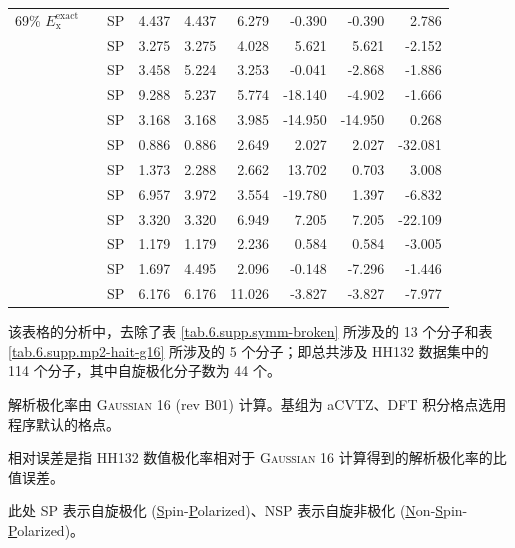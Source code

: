 \begin{table}[ht]
\begin{tabular}{lll:d{2.3}d{2.3}d{2.3}:d{3.4}d{3.4}d{3.4}}
    69\% $E_\mathrm{x}^\mathrm{exact}$ &  & SP  & 4.437 & 4.437 & 6.279  & -0.390  & -0.390  & 2.786   \\
                  &  & SP  & 3.275 & 3.275 & 4.028  & 5.621   & 5.621   & -2.152  \\
                  &  & SP  & 3.458 & 5.224 & 3.253  & -0.041  & -2.868  & -1.886  \\
                  &  & SP  & 9.288 & 5.237 & 5.774  & -18.140 & -4.902  & -1.666  \\
                  &  & SP  & 3.168 & 3.168 & 3.985  & -14.950 & -14.950 & 0.268   \\
                  &  & SP  & 0.886 & 0.886 & 2.649  & 2.027   & 2.027   & -32.081 \\
                  &  & SP  & 1.373 & 2.288 & 2.662  & 13.702  & 0.703   & 3.008   \\
                  &  & SP  & 6.957 & 3.972 & 3.554  & -19.780 & 1.397   & -6.832  \\
                  &  & SP  & 3.320 & 3.320 & 6.949  & 7.205   & 7.205   & -22.109 \\
                  &  & SP  & 1.179 & 1.179 & 2.236  & 0.584   & 0.584   & -3.005  \\
                  &  & SP  & 1.697 & 4.495 & 2.096  & -0.148  & -7.296  & -1.446  \\
                  &  & SP  & 6.176 & 6.176 & 11.026 & -3.827  & -3.827  & -7.977  \\
    \hline
    \end{tabular}

    \raggedright
    \par{} 该表格的分析中，去除了表 \ref{tab.6.supp.symm-broken} 所涉及的 13 个分子和表 \ref{tab.6.supp.mp2-hait-g16} 所涉及的 5 个分子；即总共涉及 HH132 数据集中的 114 个分子，其中自旋极化分子数为 44 个。
    \par{} 解析极化率由 \textsc{Gaussian 16} (rev B01)\cite{Gaussian16} 计算。基组为 aCVTZ、DFT 积分格点选用程序默认的格点。
    \par{} 相对误差是指 HH132 数值极化率相对于 \textsc{Gaussian 16} 计算得到的解析极化率的比值误差。
    \par{} 此处 SP 表示自旋极化 (\underline{S}pin-\underline{P}olarized)、NSP 表示自旋非极化 (\underline{N}on-\underline{S}pin-\underline{P}olarized)。
\end{table}

